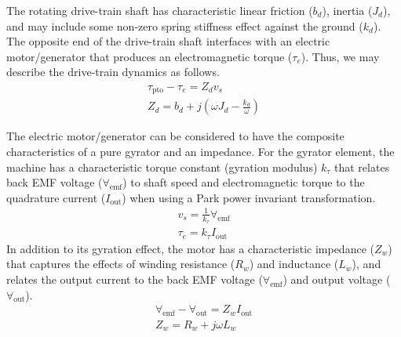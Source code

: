 \documentclass[lettersize,journal]{IEEEtran}
\newcommand{\rc}[1]{\textcolor{red}{#1}}
\begin{document}
The rotating drive-train shaft has characteristic linear friction ($b_d$), inertia ($J_d$), and may include some non-zero spring stiffness effect against the ground ($k_d$).
The opposite end of the drive-train shaft interfaces with an electric motor/generator that produces an electromagnetic torque ($\tau_e$).
Thus, we may describe the drive-train dynamics as follows.
%
\begin{subequations}
        \begin{gather}
                \tau_{\textrm{pto}} - \tau_e = Z_d v_s \\
                Z_d = b_d + j \left( \omega J_d - \frac{k_d}{\omega} \right)
        \end{gather}
\end{subequations}

The electric motor/generator can be considered to have the composite characteristics of a pure gyrator and an impedance.
For the gyrator element, the machine has a characteristic torque constant (gyration modulus) $k_\tau$ that relates back EMF voltage ($\forall_{\textrm{emf}}$) to shaft speed and electromagnetic torque to the quadrature current ($I_{\textrm{out}}$) when using a Park power invariant transformation.
%
\begin{subequations}
        \begin{gather}
                v_s = \frac{1}{k_\tau}\forall_{\textrm{emf}} \\
                \tau_e = k_\tau I_{\textrm{out}}
        \end{gather}
\end{subequations}
%
In addition to its gyration effect, the motor has a characteristic impedance ($Z_w$) that captures the effects of winding resistance ($R_w$) and inductance ($L_w$), and relates the output current to the back EMF voltage ($\forall_{\textrm{emf}}$) and output voltage ($\forall_{\textrm{out}}$).
%
\begin{subequations}
        \begin{gather}
                \forall_{\textrm{emf}} - \forall_{\textrm{out}} = Z_w I_{\textrm{out}}\\
                Z_w = R_w + j \omega L_w \label{eq:winding_impedance}
        \end{gather}
\end{subequations}
\end{document}
